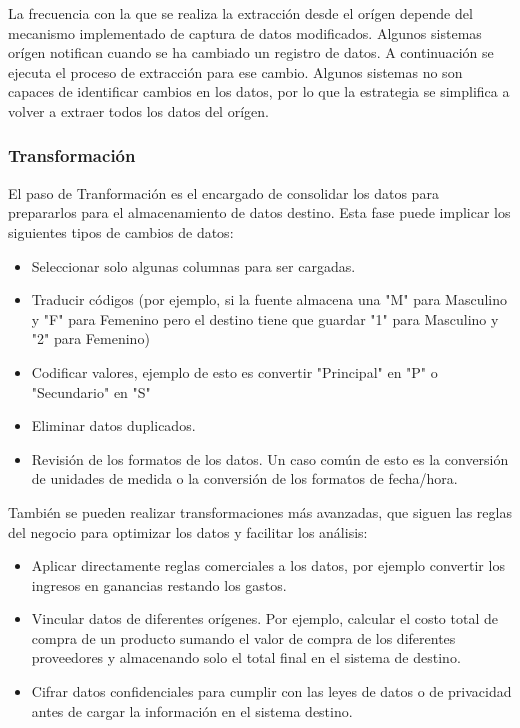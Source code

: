La frecuencia con la que se realiza la extracci\'on desde el or\'igen depende del mecanismo implementado de captura de datos 
modificados. Algunos sistemas or\'igen notifican cuando se ha cambiado un registro de datos. A continuaci\'on se ejecuta el 
proceso de extracci\'on para ese cambio. Algunos sistemas no son capaces de identificar cambios en los datos, por lo que 
la estrategia se simplifica a volver a extraer todos los datos del or\'igen.

\subsubsection{Transformaci\'on}

El paso de Tranformaci\'on es el encargado de consolidar los datos para prepararlos para el almacenamiento de datos destino. 
Esta fase puede implicar los siguientes tipos de cambios de datos:

\begin{itemize}
    \item Seleccionar solo algunas columnas para ser cargadas.
    \item Traducir c\'odigos (por ejemplo, si la fuente almacena una "M" para Masculino y "F" para Femenino pero el destino 
        tiene que guardar "1" para Masculino y "2" para Femenino)
    \item Codificar valores, ejemplo de esto es convertir "Principal" en "P" o "Secundario" en "S"
    \item Eliminar datos duplicados.
    \item Revisi\'on de los formatos de los datos. Un caso com\'un de esto es la conversi\'on de unidades de medida 
        o la conversi\'on de los formatos de fecha/hora.
\end{itemize}

También se pueden realizar transformaciones m\'as avanzadas, que siguen las reglas del negocio para optimizar los datos y 
facilitar los análisis:

\begin{itemize}
    \item Aplicar directamente reglas comerciales a los datos, por ejemplo convertir los ingresos en ganancias restando los 
        gastos.
    \item Vincular datos de diferentes or\'igenes. Por ejemplo, calcular el costo total de compra de un producto 
        sumando el valor de compra de los diferentes proveedores y almacenando solo el total final en el sistema de destino.
    \item Cifrar datos confidenciales para cumplir con las leyes de datos o de privacidad antes de cargar la informaci\'on 
        en el sistema destino.
\end{itemize}


